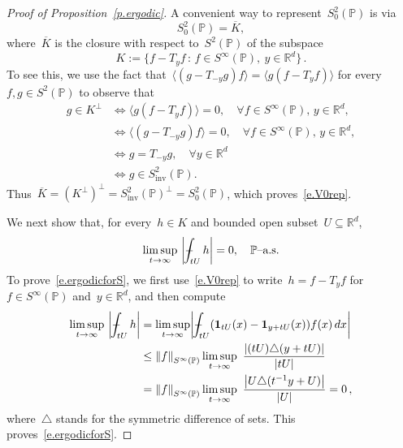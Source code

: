 \documentclass[11pt,twoside]{article} %
\numberwithin{equation}{section}
\theoremstyle{definition}
\let\originalleft\left
\let\originalright\right
\renewcommand{\left}{\mathopen{}\mathclose\bgroup\originalleft}
\renewcommand{\right}{\aftergroup\egroup\originalright}
\newcommand*{\Rd}{\ensuremath{\mathbb{R}^d}}
\newcommand{\inv}{\mathrm{inv}}
\renewcommand{\P}{\mathbb{P}}
\newcommand{\indc}{\boldsymbol{1}}
\def\Xint#1{\mathchoice
{\XXint\displaystyle\textstyle{#1}}%
{\XXint\textstyle\scriptstyle{#1}}%
{\XXint\scriptstyle\scriptscriptstyle{#1}}%
{\XXint\scriptscriptstyle\scriptscriptstyle{#1}}%
\!\int}
\def\XXint#1#2#3{{\setbox0=\hbox{$#1{#2#3}{\int}$}
\vcenter{\hbox{$#2#3$}}\kern-.5\wd0}}
\def\fint{\Xint-}
\begin{document}
\begin{proof}[Proof of Proposition~\ref{p.ergodic}]
A convenient way to represent~$S^2_{0}(\P)$ is via
\begin{equation}
\label{e.V0rep}
S^2_0(\P) = \overline{K},
\end{equation}
where~$\overline{K}$ is the closure with respect to~$S^2(\P)$ of the subspace 
\begin{equation*}
K:= \bigl\{ f - T_y f \,:\, f\in S^\infty(\P), \ y \in\Rd \bigr\}\,.
\end{equation*}
To see this, we use the fact that~$\bigl\langle (g - T_{-y}g) f  \bigr\rangle
=
\bigl\langle g(f-T_{y}f) \bigr\rangle$ for every~$f,g\in S^2(\P)$ to observe that 
\begin{align*}
g \in K^\perp
&
\iff 
\bigl\langle g(f-T_{y}f) \bigr\rangle 
= 0, \quad \forall f\in S^\infty(\P), \, y\in \Rd, 
\\ & 
\iff
\bigl\langle (g - T_{-y}g) f  \bigr\rangle 
= 0, \quad \forall f\in S^\infty(\P), \, y\in \Rd, 
\\ & 
\iff
g = T_{-y}g, \quad \forall y\in\Rd
\\ & 
\iff 
g\in S^2_{\inv}(\P). 
\end{align*}
Thus~$\overline{K} = (K^{\perp})^\perp = S^2_{\inv}(\P)^\perp = S^2_{0}(\P)$, which proves~\eqref{e.V0rep}. 

\smallskip

We next show that, for every~$h\in K$ and bounded open subset~$U\subseteq\Rd$,
\begin{equation}
\label{e.ergodicforS}
\limsup_{t \to \infty} \
\left| \fint_{tU} h \right| = 0, \quad \mbox{$\P$--a.s.}
\end{equation}
To prove~\eqref{e.ergodicforS}, we first use~\eqref{e.V0rep} to write~$h= f-T_yf$ for~$f\in S^\infty(\P)$ and~$y\in\Rd$, and then compute
\begin{align*}
\limsup_{t\to \infty} \
\left| \fint_{tU} h  \right|
&
= 
\limsup_{t\to \infty} 
\left| \fint_{tU} (\indc_{tU}(x) -  \indc_{y+tU}(x)) f(x)  \,dx \right| 
\\ & 
\leq 
\left\| f \right\|_{S^\infty(\P)}
\limsup_{t\to \infty} \
\frac{\left| (tU) \triangle (y+tU) \right|}{|tU|}
\\ &
=
\left\| f \right\|_{S^\infty(\P)}
\limsup_{t\to \infty} \
\frac{\left| U \triangle (t^{-1}y+U) \right| }{|U|}
= 0 \,,
\end{align*}
where~$\triangle$ stands for the symmetric difference of sets. This proves~\eqref{e.ergodicforS}. 


\end{proof}
\end{document}
